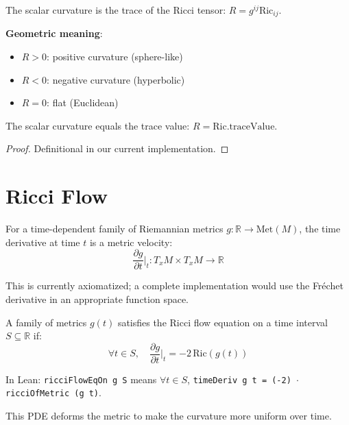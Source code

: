 \begin{definition}
\label{def:scalar_curvature}
\leanok
{}
The scalar curvature is the trace of the Ricci tensor: $R = g^{ij} \mathrm{Ric}_{ij}$.

\textbf{Geometric meaning}:
\begin{itemize}
\item $R > 0$: positive curvature (sphere-like)
\item $R < 0$: negative curvature (hyperbolic)
\item $R = 0$: flat (Euclidean)
\end{itemize}
\end{definition}

\begin{lemma}
\label{lem:scalar_curvature_eq}
\leanok
{}
The scalar curvature equals the trace value: $R = \mathrm{Ric}.\mathrm{traceValue}$.
\end{lemma}

\begin{proof}
\leanok
{}
Definitional in our current implementation.
\end{proof}

\chapter{Ricci Flow}
\label{chap:flow}

\begin{definition}
\label{def:time_deriv}
For a time-dependent family of Riemannian metrics $g : \mathbb{R} \to \mathrm{Met}(M)$, the time derivative at time $t$ is a metric velocity:
\[ \frac{\partial g}{\partial t}\Big|_t : T_xM \times T_xM \to \mathbb{R} \]

This is currently axiomatized; a complete implementation would use the Fr\'echet derivative in an appropriate function space.
\end{definition}

\begin{definition}
\label{def:ricci_flow_eq_on}
\leanok
{}
A family of metrics $g(t)$ satisfies the Ricci flow equation on a time interval $S \subseteq \mathbb{R}$ if:
\[ \forall t \in S, \quad \frac{\partial g}{\partial t}\Big|_t = -2 \, \mathrm{Ric}(g(t)) \]

In Lean: \texttt{ricciFlowEqOn g S} means $\forall t \in S$, \texttt{timeDeriv g t = (-2) $\cdot$ ricciOfMetric (g t)}.

This PDE deforms the metric to make the curvature more uniform over time.
\end{definition}

